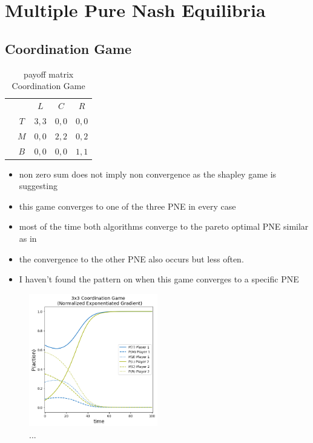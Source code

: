 \section{Multiple Pure Nash Equilibria}\label{section:multiplePureNashEquilibria}

\subsection{Coordination Game}\label{subsection:coordinationGame}

\begin{table}\centering
\setlength{\extrarowheight}{2pt}
\begin{tabular}{cc|c|c|c|}
  & \multicolumn{1}{c}{} & \multicolumn{1}{c}{$L$}  & \multicolumn{1}{c}{$C$}  & \multicolumn{1}{c}{$R$} \\\cline{3-5}
            & $T$ & $3,3$ & $0,0$ & $0,0$ \\ \cline{3-5}
            & $M$ & $0,0$ & $2,2$ & $0,2$ \\\cline{3-5}
            & $B$ & $0,0$ & $0,0$ & $1,1$ \\\cline{3-5}
\end{tabular}\caption{\label{tab:payoffCoordination3x3}payoff matrix Coordination Game}
\end{table}

\begin{itemize}
    \item non zero sum does not imply non convergence as the shapley game is suggesting
    \item this game converges to one of the three PNE in every case
    \item most of the time both algorithms converge to the pareto optimal PNE similar as in \cite{jafari}
    \item the convergence to the other PNE also occurs but less often.
    \item I haven't found the pattern on when this game converges to a specific PNE
\end{itemize}

\begin{figure}
    \centering
    \includegraphics[width=0.5\textwidth]{logos/Coordination3x3-1.png}
    \caption{...}
    \label{Coordination3x3-1}
\end{figure}

